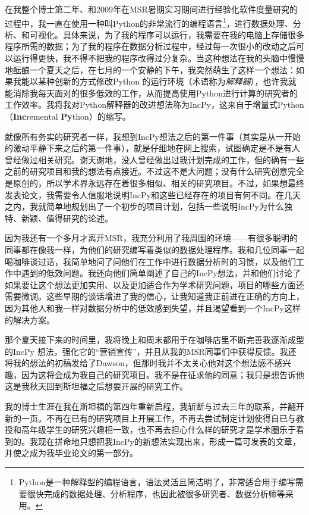 \documentclass[12pt,UTF8,nofonts]{book}
\begin{document}
在我整个博士第二年、和2009年在MSR暑期实习期间进行经验化软件度量研究的过程中，我一直在使用一种叫Python的非常流行的编程语言\footnote{Python是一种解释型的编程语言，语法灵活且简洁明了，非常适合用于编写需要很快完成的数据处理、分析程序，也因此被很多研究者、数据分析师等采用。}，进行数据处理、分析、和可视化。具体来说，为了我的程序可以运行，我需要在我的电脑上存储很多程序所需的数据；为了我的程序在数据分析过程中，经过每一次很小的改动之后可以运行得更快，我不得不把我的程序改得过分复杂。当这种想法在我的头脑中慢慢地酝酿一个夏天之后，在七月的一个安静的下午，我突然萌生了这样一个想法：如果我能以某种创新的方式修改Python 的运行环境（术语称为\emph{解释器}），也许我就能消除我每天面对的很多低效的工作，从而提高使用Python进行计算的研究者的工作效率。我将我对Python解释器的改进想法称为IncPy，这来自于增量式Python （\textbf{Inc}remental \textbf{Py}thon）的缩写。

\breakline

就像所有务实的研究者一样，我想到IncPy想法之后的第一件事（其实是从一开始的激动平静下来之后的第一件事），就是仔细地在网上搜索，试图确定是不是有人曾经做过相关研究。谢天谢地，没人曾经做出过我计划完成的工作，但的确有一些之前的研究项目和我的想法有点接近。不过这不是大问题；没有什么研究创意完全是原创的，所以学术界永远存在着很多相似、相关的研究项目。不过，如果想最终发表论文，我需要令人信服地说明IncPy和这些已经存在的项目有何不同。在几天之内，我就简单地规划出了一个初步的项目计划，包括一些说明IncPy为什么独特、新颖、值得研究的论述。

因为我还有一个多月才离开MSR，我充分利用了我周围的环境——有很多聪明的同事都在像我一样，为他们的研究编写着类似的数据处理程序。我和几位同事一起喝咖啡谈过话，我简单地问了问他们在工作中进行数据分析时的习惯，以及他们工作中遇到的低效问题。我还向他们简单阐述了自己的IncPy想法，并和他们讨论了如果要让这个想法更加实用、以及更加适合作为学术研究问题，项目的哪些方面还需要微调。这些早期的谈话增进了我的信心，让我知道我正前进在正确的方向上，因为其他人和我一样对数据分析中的低效感到失望，并且渴望看到一个IncPy这样的解决方案。

那个夏天接下来的时间里，我将晚上和周末都用于在咖啡店里不断完善我逐渐成型的IncPy 想法，强化它的“营销宣传”，并且从我的MSR同事们中获得反馈。我还将我的想法的初稿发给了Dawson，但那时我并不太关心他对这个想法感不感兴趣，因为这将会成为我自己的研究项目。我不是在征求他的同意；我只是想告诉他这是我秋天回到斯坦福之后想要开展的研究工作。

\breakline

我的博士生涯在我在斯坦福的第四年重新启程，我斩断与过去三年的联系，并翻开新的一页。不再在已有的研究项目上开展工作，不再去尝试制定计划使得自已与教授和高年级学生的研究兴趣相一致，也不再去担心什么样的研究才是学术圈乐于看到的。我现在拼命地只想把我IncPy的新想法实现出来，形成一篇可发表的文章，并使之成为我毕业论文的第一部分。
\end{document}
